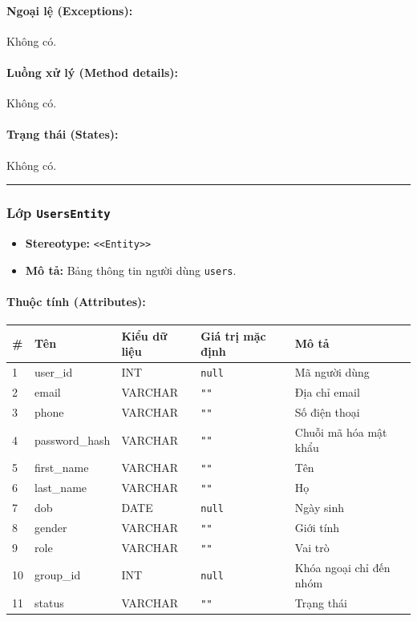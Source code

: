 \documentclass[12pt,a4paper]{article}
\begin{document}
\paragraph{Ngoại lệ (Exceptions):}
Không có.

\paragraph{Luồng xử lý (Method details):}
Không có.

\paragraph{Trạng thái (States):}
Không có.

\vskip 0.5cm
\noindent\rule{\textwidth}{0.5pt}
\vskip 0.5cm

\subsubsection{Lớp \texttt{UsersEntity}}
\begin{itemize}[leftmargin=*]
    \item \textbf{Stereotype:} \texttt{\textless{}\textless{}Entity\textgreater{}\textgreater{}}
    \item \textbf{Mô tả:} Bảng thông tin người dùng \texttt{users}.
\end{itemize}

\paragraph{Thuộc tính (Attributes):}
\begin{longtable}{|p{0.6cm}|p{2.8cm}|p{2.2cm}|p{1.8cm}|p{5.8cm}|}
\hline
\textbf{\#} & \textbf{Tên} & \textbf{Kiểu dữ liệu} & \textbf{Giá trị mặc định} & \textbf{Mô tả} \\ \hline
\endhead
1 & user\_id & INT & \texttt{null} & Mã người dùng \\ \hline
2 & email & VARCHAR & \texttt{""} & Địa chỉ email \\ \hline
3 & phone & VARCHAR & \texttt{""} & Số điện thoại \\ \hline
4 & password\_hash & VARCHAR & \texttt{""} & Chuỗi mã hóa mật khẩu \\ \hline
5 & first\_name & VARCHAR & \texttt{""} & Tên \\ \hline
6 & last\_name & VARCHAR & \texttt{""} & Họ \\ \hline
7 & dob & DATE & \texttt{null} & Ngày sinh \\ \hline
8 & gender & VARCHAR & \texttt{""} & Giới tính \\ \hline
9 & role & VARCHAR & \texttt{""} & Vai trò \\ \hline
10 & group\_id & INT & \texttt{null} & Khóa ngoại chỉ đến nhóm \\ \hline
11 & status & VARCHAR & \texttt{""} & Trạng thái \\ \hline
\end{longtable}
\end{document}
